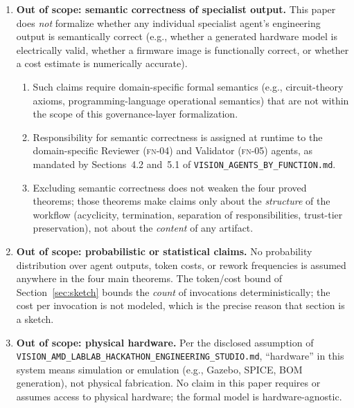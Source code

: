 \documentclass[12pt]{article}
\theoremstyle{definition}
\newcommand{\code}[1]{\texttt{#1}}
\newcommand{\FN}[1]{\textsc{fn-#1}}
\newcommand{\VisionFunc}{\code{VISION\_AGENTS\_\allowbreak BY\_FUNCTION.md}}
\newcommand{\VisionHackathon}{\code{VISION\_AMD\_\allowbreak LABLAB\_\allowbreak HACKATHON\_\allowbreak ENGINEERING\_STUDIO.md}}
\begin{document}
\begin{enumerate}
    \item \textbf{Out of scope: semantic correctness of specialist
          output.}
          This paper does \emph{not} formalize whether any individual
          specialist agent's engineering output is semantically correct
          (e.g., whether a generated hardware model is electrically valid,
          whether a firmware image is functionally correct, or whether a
          cost estimate is numerically accurate).
          \begin{enumerate}
              \item[E1.] Such claims require domain-specific formal
                         semantics (e.g., circuit-theory axioms,
                         programming-language operational semantics)
                         that are not within the scope of this
                         governance-layer formalization.
              \item[E2.] Responsibility for semantic correctness is
                         assigned at runtime to the domain-specific
                         Reviewer (\FN{04}) and Validator (\FN{05})
                         agents, as mandated by Sections~4.2 and~5.1
                         of \VisionFunc{}.
              \item[E3.] Excluding semantic correctness does not weaken
                         the four proved theorems; those theorems make
                         claims only about the \emph{structure} of the
                         workflow (acyclicity, termination, separation of
                         responsibilities, trust-tier preservation), not
                         about the \emph{content} of any artifact.
          \end{enumerate}

    \item \textbf{Out of scope: probabilistic or statistical claims.}
          No probability distribution over agent outputs, token costs,
          or rework frequencies is assumed anywhere in the four main
          theorems.
          The token/cost bound of Section~\ref{sec:sketch} bounds the
          \emph{count} of invocations deterministically; the cost per
          invocation is not modeled, which is the precise reason that
          section is a sketch.

    \item \textbf{Out of scope: physical hardware.}
          Per the disclosed assumption of \VisionHackathon{},
          ``hardware'' in this system means simulation or emulation
          (e.g., Gazebo, SPICE, BOM generation), not physical
          fabrication.
          No claim in this paper requires or assumes access to
          physical hardware; the formal model is hardware-agnostic.


\end{enumerate}
\end{document}

